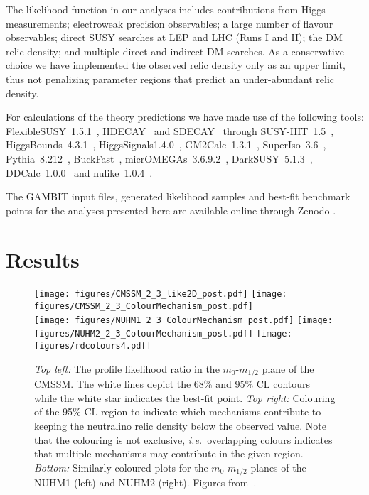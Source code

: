\documentclass{PoS}
\newcommand{\gambit}{\textsf{GAMBIT}\xspace}
\newcommand{\GB}{\gambit}
\newcommand{\buckfast}{\textsf{BuckFast}\xspace}
\newcommand{\pythia}{\textsf{Pythia}\xspace}
\newcommand{\higgsbounds}{\textsf{HiggsBounds}\xspace}
\newcommand{\higgssignals}{\textsf{HiggsSignals}\xspace}
\newcommand{\ds}{\textsf{DarkSUSY}\xspace}
\newcommand{\darksusy}{\ds}
\newcommand{\micromegas}{\textsf{micrOMEGAs}\xspace}
\newcommand\FlexibleSUSY{\textsf{FlexibleSUSY}\xspace}
\newcommand\HDECAY{\textsf{HDECAY}\xspace}
\newcommand\SDECAY{\textsf{SDECAY}\xspace}
\newcommand\SUSYHIT{\textsf{SUSY-HIT}\xspace}
\newcommand\susyhit{\SUSYHIT}
\newcommand\gmtwocalc{\textsf{GM2Calc}\xspace}
\newcommand\superiso{\textsf{SuperIso}\xspace}
\newcommand\nulike{\textsf{nulike}\xspace}
\newcommand\ddcalc{\textsf{DDCalc}\xspace}
\begin{document}
The likelihood function in our analyses includes contributions from Higgs measurements; electroweak precision observables; a large number of flavour observables; direct SUSY searches at LEP and LHC (Runs I and II); the DM relic density; and multiple direct and indirect DM searches. As a conservative choice we have implemented the observed relic density only as an upper limit, thus not penalizing parameter regions that predict an under-abundant relic density.


For calculations of the theory predictions we have made use of the following tools: \FlexibleSUSY~\textsf{1.5.1}~\cite{Athron:2014yba}, \HDECAY~\cite{Djouadi:1997yw} and \SDECAY~\cite{Muhlleitner:2003vg} through \susyhit~\textsf{1.5}~\cite{Djouadi:2006bz}, \higgsbounds~\textsf{4.3.1}~\cite{Bechtle:2008jh,Bechtle:2011sb,Bechtle:2013wla}, \higgssignals \textsf{1.4.0}~\cite{HiggsSignals}, \gmtwocalc~\textsf{1.3.1}~\cite{gm2calc}, \superiso~\textsf{3.6}~\cite{Mahmoudi:2007vz,Mahmoudi:2008tp}, \pythia~\textsf{8.212}~\cite{Sjostrand:2006za,Sjostrand:2014zea}, \buckfast~\cite{ColliderBit}, \micromegas~\textsf{3.6.9.2}~\cite{micromegas}, \darksusy~\textsf{5.1.3}~\cite{darksusy}, \ddcalc~\textsf{1.0.0}~\cite{DarkBit} and \nulike~\textsf{1.0.4}~\cite{IC22Methods,IC79_SUSY}.


The \GB input files, generated likelihood samples and best-fit benchmark points for the analyses presented here are available online through \textsf{Zenodo} \cite{the_gambit_collaboration_2017_801642,the_gambit_collaboration_2017_801640}.




\section{Results}

\begin{figure*}%
  \centering
  \texttt{[image: figures/CMSSM\_2\_3\_like2D\_post.pdf]}
  \texttt{[image: figures/CMSSM\_2\_3\_ColourMechanism\_post.pdf]}\\
  \texttt{[image: figures/NUHM1\_2\_3\_ColourMechanism\_post.pdf]}
  \texttt{[image: figures/NUHM2\_2\_3\_ColourMechanism\_post.pdf]}
  \texttt{[image: figures/rdcolours4.pdf]}
  \caption{
  \textit{Top left:} The profile likelihood ratio in the $m_0$-$m_{1/2}$ plane of the CMSSM. The white lines depict the 68\% and 95\% CL contours while the white star indicates the best-fit point. 
  \textit{Top right:} Colouring of the 95\% CL region to indicate which mechanisms contribute to keeping the neutralino relic density below the observed value. Note that the colouring is not exclusive, \textit{i.e.}\ overlapping colours indicates that multiple mechanisms may contribute in the given region.
  \textit{Bottom:} Similarly coloured plots for the $m_0$-$m_{1/2}$ planes of the NUHM1 (left) and NUHM2 (right). Figures from~\cite{CMSSM}.
  }
  \label{fig:m0_m12_cmssm_nuhm}
\end{figure*}
\end{document}
